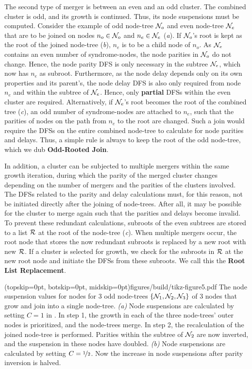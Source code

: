 The second type of merger is between an even and an odd cluster. The combined cluster is odd, and its growth is continued. Thus, its node suspensions must be computed. Consider the example of odd node-tree $\mathcal{N}_o$ and even node-tree $\mathcal{N}_e$ that are to be joined on nodes $n_o\in \mathcal{N}_o$ and $n_e \in \mathcal{N}_e$ (\emph{a}). If $\mathcal{N}_o$'s root is kept as the root of the joined node-tree (\emph{b}), $n_e$ is to be a child node of $n_o$. As $\mathcal{N}_e$ contains an even number of syndrome-nodes, the node parities in $\mathcal{N}_o$ do not change. Hence, the node parity DFS is only necessary in the subtree $\mathcal{N}_e$, which now has $n_e$ as subroot. Furthermore, as the node delay depends only on its own properties and its parent's, the node delay DFS is also only required from node $n_e$ and within the subtree of $\mathcal{N}_e$. Hence, only \textbf{partial} DFSs within the even cluster are required. %
Alternatively, if $\mathcal{N}_e$'s root becomes the root of the combined tree (\emph{c}), an odd number of syndrome-nodes are attached to $n_e$, such that the parities of nodes on the path from $n_e$ to the root are changed. Such a join would require the DFSs on the entire combined node-tree to calculate for node parities and delays. Thus, a simple rule is always to keep the root of the odd node-tree, which we dub \textbf{Odd-Rooted Join}.

In addition, a cluster can be subjected to multiple mergers within the same growth iteration, during which the parity of the merged cluster changes depending on the number of mergers and the parities of the clusters involved. The DFSs related to the parity and delay calculations must, for this reason, not be initiated directly after the joining of node-trees. After all, it may be possible for the cluster to merge again such that the parities and delays become invalid. To prevent these redundant calculations, subroots of the even subtrees are stored to a list $\mathcal{R}$ at the root of the node-tree (\emph{c}). When multiple mergers occur, the root node that stores the now redundant subroots is replaced by a new root with new $\mathcal{R}$. If a cluster is selected for growth, we check for the subroots in $\mathcal{R}$ at the new root node and initiate the DFSs from these subroots. We call this the \textbf{Root List Replacement}. 

\Figure[htb](topskip=0pt, botskip=0pt, midskip=0pt){figures/build/tikz-figure5.pdf}{
    The node suspension values for nodes for 3 odd node-trees $\{\mathcal{N}_1, \mathcal{N}_2, \mathcal{N}_3\}$ of 3 nodes that grow and join into a single node-tree. \emph{(a)} Node suspensions are calculated by setting $C=1$ in . In step 1, the growth in each of the three node-trees' outer nodes is prioritized, and the node-trees merge. In step 2, the recalculation of the joined node-tree is performed. Parities within the subtree of $\mathcal{N}_2$ are now inverted, and the suspension in these nodes have doubled. \emph{(b)} Node suspensions are calculated by setting $C=\nicefrac{1}{2}$. Now the increase in node suspensions after parity inversion is halved.\label{fig5}}

